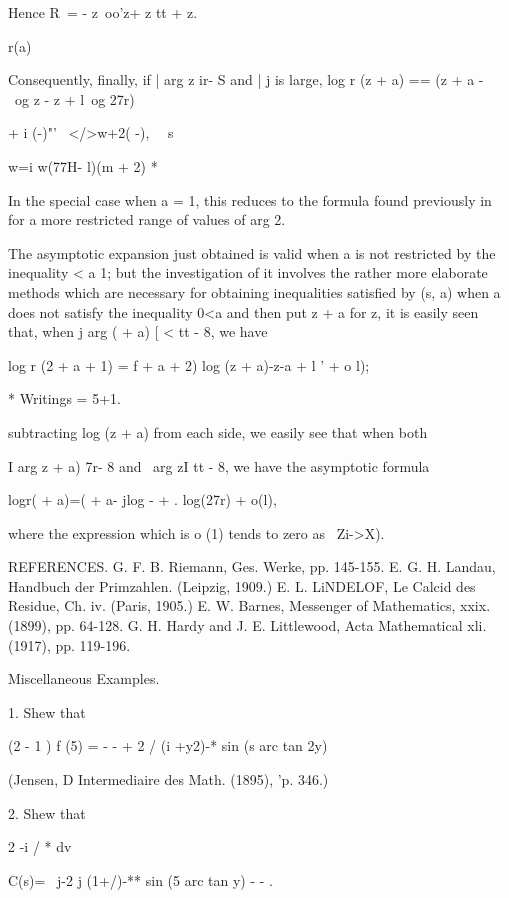 {{Hence R\ = - z\ oo'z+ z tt + z.

r(a)

Consequently, finally, if | arg z ir- S and | j is large, log r (z +
a) == (z + a -~ \ og z - z + l\ og 27r)

+ i (-)"'~ </>w+2( -), \ \ s

w=i w(77H- l)(m + 2) *

In the special case when a = 1, this reduces to the formula found
previously in for a more restricted range of values of arg 2.

The asymptotic expansion just obtained is valid when a is not
restricted by the inequality < a 1; but the investigation of it
involves the rather more elaborate methods which are necessary for
obtaining inequalities satisfied by (s, a) when a does not satisfy the
inequality 0<a%
and then put z + a for z, it is easily seen that, when j arg ( + a) [
< tt - 8, we have

log r (2 + a + 1) = f + a + 2) log (z + a)-z-a + l ' + o l);

* Writings = 5+1.

%
%

subtracting log (z + a) from each side, we easily see that when both

I arg z + a) 7r- 8 and \ arg zI tt - 8, we have the asymptotic formula

logr( + a)=( + a- jlog - + . log(27r) + o(l),

where the expression which is o (1) tends to zero as \ Zi->X).

REFERENCES. G. F. B. Riemann, Ges. Werke, pp. 145-155. E. G. H.
Landau, Handbuch der Primzahlen. (Leipzig, 1909.) E. L. LiNDELOF, Le
Calcid des Residue, Ch. iv. (Paris, 1905.) E. W. Barnes, Messenger of
Mathematics, xxix. (1899), pp. 64-128. G. H. Hardy and J. E.
Littlewood, Acta Mathematical xli. (1917), pp. 119-196.

Miscellaneous Examples.

1. Shew that

(2 - 1 ) f (5) = - - + 2 / (i +y2)-* sin (s arc tan 2y)

(Jensen, D Intermediaire des Math. (1895), 'p. 346.)

2. Shew that

2 -i / * dv

C(s)= \ j-2 j (1+/)-** sin (5 arc tan y) - - .


}}

